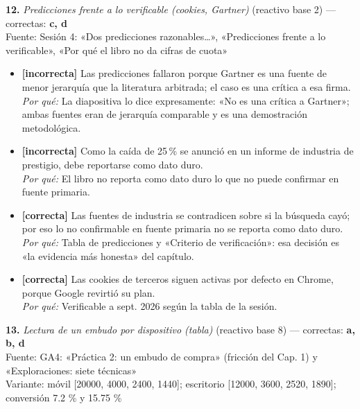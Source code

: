 \documentclass[10pt,letterpaper]{article}
\begin{document}
{\vspace{3pt}\noindent\textbf{12.} \textit{Predicciones frente a lo verificable (cookies, Gartner)} (reactivo base 2) — correctas: \textbf{c, d}\\[-1pt]
{\scriptsize Fuente: Sesión 4: «Dos predicciones razonables…», «Predicciones frente a lo verificable», «Por qué el libro no da cifras de cuota»}
\begin{itemize}[leftmargin=1.2em,itemsep=0pt,topsep=1pt,parsep=0pt]
\item[\textbf{a)}] {\footnotesize \textbf{[incorrecta]} Las predicciones fallaron porque Gartner es una fuente de menor jerarquía que la literatura arbitrada; el caso es una crítica a esa firma.\\ \textit{Por qué:} La diapositiva lo dice expresamente: «No es una crítica a Gartner»; ambas fuentes eran de jerarquía comparable y es una demostración metodológica.}
\item[\textbf{b)}] {\footnotesize \textbf{[incorrecta]} Como la caída de 25\,\% se anunció en un informe de industria de prestigio, debe reportarse como dato duro.\\ \textit{Por qué:} El libro no reporta como dato duro lo que no puede confirmar en fuente primaria.}
\item[\textbf{c)}] {\footnotesize \textbf{[correcta]} Las fuentes de industria se contradicen sobre si la búsqueda cayó; por eso lo no confirmable en fuente primaria no se reporta como dato duro.\\ \textit{Por qué:} Tabla de predicciones y «Criterio de verificación»: esa decisión es «la evidencia más honesta» del capítulo.}
\item[\textbf{d)}] {\footnotesize \textbf{[correcta]} Las cookies de terceros siguen activas por defecto en Chrome, porque Google revirtió su plan.\\ \textit{Por qué:} Verificable a sept. 2026 según la tabla de la sesión.}
\end{itemize}
\vspace{3pt}\noindent\textbf{13.} \textit{Lectura de un embudo por dispositivo (tabla)} (reactivo base 8) — correctas: \textbf{a, b, d}\\[-1pt]
{\scriptsize Fuente: GA4: «Práctica 2: un embudo de compra» (fricción del Cap. 1) y «Exploraciones: siete técnicas»}
\\{\scriptsize Variante: móvil [20000, 4000, 2400, 1440]; escritorio [12000, 3600, 2520, 1890]; conversión 7.2 \% y 15.75 \%}
\begin{itemize}[leftmargin=1.2em,itemsep=0pt,topsep=1pt,parsep=0pt]

\end{itemize}}
\end{document}
